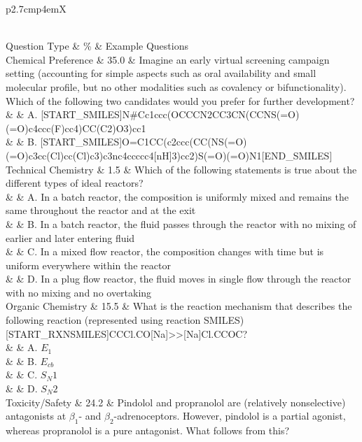 \begin{xltabular}{\textwidth}{p{2.7cm}p{4em}X}
        \caption{\textbf{Examples for each of the topics considered in the evaluation of the \chembench corpus.} The table shows the percentage of questions in the corpus that belong to each topic, as well as example questions.} \\

        \toprule
        Question Type & \% & Example Questions  \\
        \midrule
        Chemical Preference & 35.0 & Imagine an early virtual screening campaign setting (accounting for simple aspects such as oral availability and small molecular profile, but no other modalities such as covalency or bifunctionality). Which of the following two candidates would you prefer for further development? \\
        & & A. [START\_SMILES]N\#Cc1ccc(OCCCN2CC3CN\-(CCNS(=O)(=O)c4ccc(F)cc4)CC(C2)O3)cc1 \\
        & & B. [START\_SMILES]O=C1CC(c2ccc(CC(NS(=O)\-(=O)\-c3cc(Cl)cc(Cl)c3)c3nc4ccccc4[nH]3)cc2)S\-(=O)\-(=O)N1[END\_SMILES] \\
        \midrule
        Technical Chemistry & 1.5 & Which of the following statements is true about the different types of ideal reactors? \\
        & & A. In a batch reactor, the composition is uniformly mixed and remains the same throughout the reactor and at the exit \\
        & & B. In a batch reactor, the fluid passes through the reactor with no mixing of earlier and later entering fluid \\
        & & C. In a mixed flow reactor, the composition changes with time but is uniform everywhere within the reactor \\
        & & D. In a plug flow reactor, the fluid moves in single flow through the reactor with no mixing and no overtaking \\
        \midrule
        Organic Chemistry & 15.5 & What is the reaction mechanism that describes the following reaction (represented using reaction SMILES) [START\_RXNSMILES]CCCl.CO[Na]>>[Na]Cl.CCOC? \\
        & & A. $E_1$ \\
        & & B. $E_{cb}$ \\
        & & C. $S_N1$ \\
        & & D. $S_N2$ \\
        \midrule
        Toxicity/Safety & 24.2 & Pindolol and propranolol are (relatively nonselective) antagonists at $\beta_1$- and $\beta_2$-adrenoceptors. However, pindolol is a partial agonist, whereas propranolol is a pure antagonist. What follows from this? \\

\end{xltabular}

